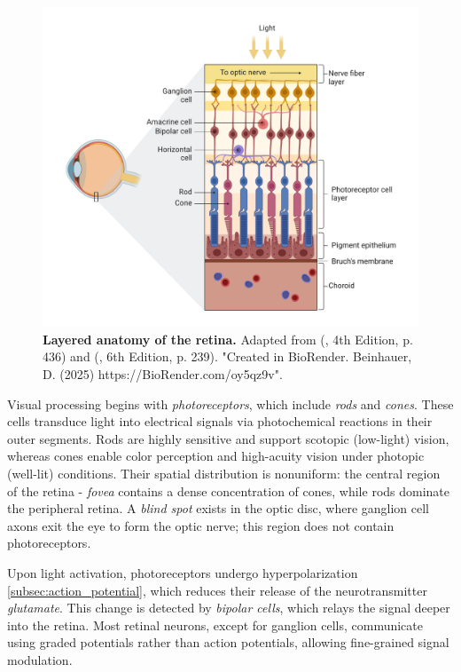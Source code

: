 \begin{figure}
    \centering
    \includegraphics[width=\linewidth]{img/retina_anatomy.pdf}
    \caption{\textbf{Layered anatomy of the retina.} Adapted from (\citet{schwartz1991principles}, 4th Edition, p. 436) and (\citet{purves2019neurosciences}, 6th Edition, p. 239). "Created in BioRender. Beinhauer, D. (2025) https://BioRender.com/oy5qz9v".}
    \label{fig:retina_anatomy}
\end{figure}

Visual processing begins with \emph{photoreceptors}, which include \emph{rods} and \emph{cones}. These cells transduce light into electrical signals via photochemical reactions in their outer segments. Rods are highly sensitive and support scotopic (low-light) vision, whereas cones enable color perception and high-acuity vision under photopic (well-lit) conditions. Their spatial distribution is nonuniform: the central region of the retina - \emph{fovea} contains a dense concentration of cones, while rods dominate the peripheral retina. A \emph{blind spot} exists in the optic disc, where ganglion cell axons exit the eye to form the optic nerve; this region does not contain photoreceptors.    

Upon light activation, photoreceptors undergo hyperpolarization \ref{subsec:action_potential}, which reduces their release of the neurotransmitter \emph{glutamate}. This change is detected by \emph{bipolar cells}, which relays the signal deeper into the retina. Most retinal neurons, except for ganglion cells, communicate using graded potentials rather than action potentials, allowing fine-grained signal modulation.

